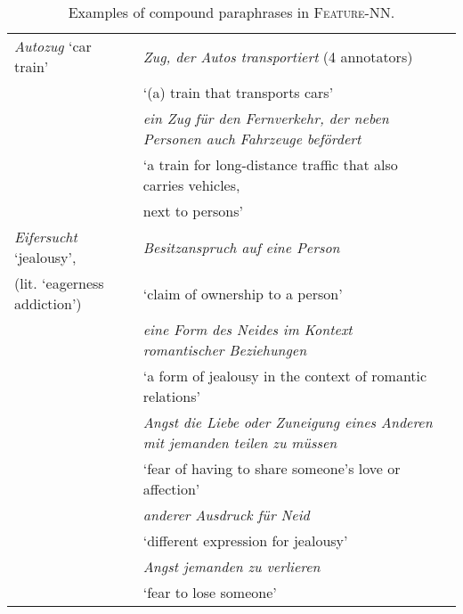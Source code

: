 \documentclass[output=paper,colorlinks,citecolor=brown]{langscibook}
\begin{document}
\begin{table}
\caption{Examples of compound paraphrases in \textsc{Feature-NN}.}
\label{tab:ex-features-comp}
\footnotesize
  \begin{tabularx}{\textwidth}{p{4cm}p{7.5cm}l}
  \lsptoprule

\textit{Autozug} `car train' &	\textit{\op{ein}\cp Zug, der Autos transportiert} (4 annotators)\\
& \hspace*{+3mm}`(a) train that transports cars'\\
& \textit{ein Zug für den Fernverkehr, der neben Personen auch Fahrzeuge befördert}\\
& \hspace*{+3mm}`a train for long-distance traffic that also carries vehicles,\\
& \hspace*{+4mm}next to persons'\\
\midrule

\textit{Eifersucht} `jealousy',  &	\textit{Besitzanspruch auf eine Person}\\
\hspace*{+3mm}(lit. `eagerness addiction') &  \hspace*{+3mm}`claim of ownership to a person'\\
& \textit{eine Form des Neides im Kontext romantischer Beziehungen}\\
& \hspace*{+3mm}`a form of jealousy in the context of romantic relations'\\
&	\textit{Angst die Liebe oder Zuneigung eines Anderen mit jemanden teilen zu müssen}\\
& \hspace*{+3mm}`fear of having to share someone's love or affection'\\
&	\textit{anderer Ausdruck für Neid}\\
& \hspace*{+3mm}`different expression for jealousy'\\
&	\textit{Angst jemanden zu verlieren}\\
& \hspace*{+3mm}`fear to lose someone'\\
\midrule


\end{tabularx}
\end{table}
\end{document}
